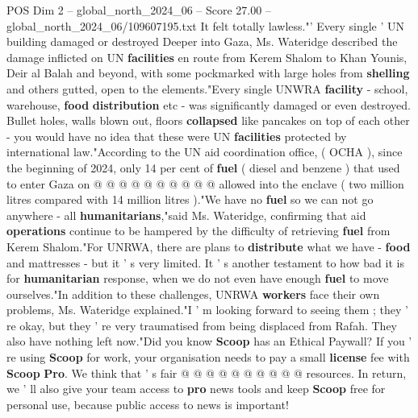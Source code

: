 \begin{textsample}{POS Dim 2 – global\_north\_2024\_06 – Score 27.00 – global\_north\_2024\_06/109607195.txt}
It felt totally lawless."' Every single ' UN building damaged or destroyed Deeper into Gaza, Ms.
Wateridge described the damage inflicted on UN \textbf{facilities} en route from Kerem Shalom to Khan Younis, Deir al Balah and beyond, with some pockmarked with large holes from \textbf{shelling} and others gutted, open to the elements."Every single UNWRA \textbf{facility} - school, warehouse, \textbf{food} \textbf{distribution} etc - was significantly damaged or even destroyed.
Bullet holes, walls blown out, floors \textbf{collapsed} like pancakes on top of each other - you would have no idea that these were UN \textbf{facilities} protected by international law."According to the UN aid coordination office, ( OCHA ), since the beginning of 2024, only 14 per cent of \textbf{fuel} ( diesel and benzene ) that used to enter Gaza on @ @ @ @ @ @ @ @ @ @ allowed into the enclave ( two million litres compared with 14 million litres )."We have no \textbf{fuel} so we can not go anywhere - all \textbf{humanitarians},"said Ms.
Wateridge, confirming that aid \textbf{operations} continue to be hampered by the difficulty of retrieving \textbf{fuel} from Kerem Shalom."For UNRWA, there are plans to \textbf{distribute} what we have - \textbf{food} and mattresses - but it ' s very limited.
It ' s another testament to how bad it is for \textbf{humanitarian} response, when we do not even have enough \textbf{fuel} to move ourselves."In addition to these challenges, UNRWA \textbf{workers} face their own problems, Ms.
Wateridge explained."I ' m looking forward to seeing them ; they ' re okay, but they ' re very traumatised from being displaced from Rafah.
They also have nothing left now."Did you know \textbf{Scoop} has an Ethical Paywall?
If you ' re using \textbf{Scoop} for work, your organisation needs to pay a small \textbf{license} fee with \textbf{Scoop} \textbf{Pro}.
We think that ' s fair @ @ @ @ @ @ @ @ @ @ resources.
In return, we ' ll also give your team access to \textbf{pro} news tools and keep \textbf{Scoop} free for personal use, because public access to news is important!

\end{textsample}

